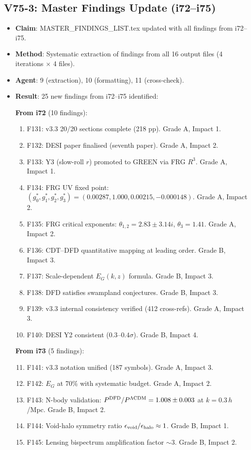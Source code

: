 \documentclass[11pt,a4paper]{article}
\begin{document}
\subsection{V75-3: Master Findings Update (i72--i75)}
\begin{itemize}[nosep]
\item \textbf{Claim}: MASTER\_FINDINGS\_LIST.tex updated with all findings from i72--i75.
\item \textbf{Method}: Systematic extraction of findings from all 16 output files (4 iterations $\times$ 4 files).
\item \textbf{Agent}: 9 (extraction), 10 (formatting), 11 (cross-check).
\item \textbf{Result}: 25 new findings from i72--i75 identified:

  \textbf{From i72} (10 findings):
  \begin{enumerate}[nosep]
  \item F131: v3.3 20/20 sections complete (218 pp). Grade A, Impact 1.
  \item F132: DESI paper finalised (seventh paper). Grade A, Impact 2.
  \item F133: Y3 (slow-roll $r$) promoted to GREEN via FRG $R^3$. Grade A, Impact 1.
  \item F134: FRG UV fixed point: $(g_0^*, g_1^*, g_2^*, g_3^*) = (0.00287, 1.000, 0.00215, -0.000148)$. Grade A, Impact 2.
  \item F135: FRG critical exponents: $\theta_{1,2} = 2.83 \pm 3.14i$, $\theta_3 = 1.41$. Grade A, Impact 2.
  \item F136: CDT--DFD quantitative mapping at leading order. Grade B, Impact 3.
  \item F137: Scale-dependent $E_G(k,z)$ formula. Grade B, Impact 3.
  \item F138: DFD satisfies swampland conjectures. Grade B, Impact 3.
  \item F139: v3.3 internal consistency verified (412 cross-refs). Grade A, Impact 3.
  \item F140: DESI Y2 consistent ($0.3$--$0.4\sigma$). Grade B, Impact 4.
  \end{enumerate}

  \textbf{From i73} (5 findings):
  \begin{enumerate}[nosep]
  \setcounter{enumi}{10}
  \item F141: v3.3 notation unified (187 symbols). Grade A, Impact 3.
  \item F142: $E_G$ at 70\% with systematic budget. Grade A, Impact 2.
  \item F143: N-body validation: $P^{\rm DFD}/P^{\rm \Lambda CDM} = 1.008 \pm 0.003$ at $k = 0.3\,h$/Mpc. Grade B, Impact 2.
  \item F144: Void-halo symmetry ratio $\epsilon_{\rm void}/\epsilon_{\rm halo} \approx 1$. Grade B, Impact 1.
  \item F145: Lensing bispectrum amplification factor $\sim 3$. Grade B, Impact 2.
  \end{enumerate}


\end{itemize}
\end{document}
